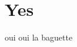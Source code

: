 \documentclass[../Thesis]{subfiles}
\begin{document}
\section{Yes}

oui oui la baguette
\end{document}
